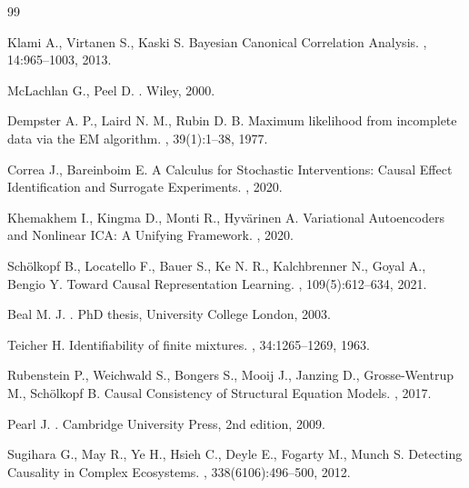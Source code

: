 \documentclass[a4paper,14pt]{article}
\theoremstyle{plain} %
\theoremstyle{definition} %
\theoremstyle{remark} %
\begin{document}
\begin{thebibliography}{99}

Klami A., Virtanen S., Kaski S.
\newblock Bayesian Canonical Correlation Analysis.
, 14:965--1003, 2013.

McLachlan G., Peel D.
.
\newblock Wiley, 2000.

Dempster A. P., Laird N. M., Rubin D. B.
\newblock Maximum likelihood from incomplete data via the EM algorithm.
, 39(1):1--38, 1977.

Correa J., Bareinboim E.
\newblock A Calculus for Stochastic Interventions: Causal Effect Identification and Surrogate Experiments.
, 2020.

Khemakhem I., Kingma D., Monti R., Hyvärinen A.
\newblock Variational Autoencoders and Nonlinear ICA: A Unifying Framework.
, 2020.

Schölkopf B., Locatello F., Bauer S., Ke N. R., Kalchbrenner N., Goyal A., Bengio Y.
\newblock Toward Causal Representation Learning.
, 109(5):612--634, 2021.

Beal M. J.
.
\newblock PhD thesis, University College London, 2003.

Teicher H.
\newblock Identifiability of finite mixtures.
, 34:1265--1269, 1963.

Rubenstein P., Weichwald S., Bongers S., Mooij J., Janzing D., Grosse-Wentrup M., Schölkopf B.
\newblock Causal Consistency of Structural Equation Models.
, 2017.

Pearl J.
.
\newblock Cambridge University Press, 2nd edition, 2009.

Sugihara G., May R., Ye H., Hsieh C., Deyle E., Fogarty M., Munch S.
\newblock Detecting Causality in Complex Ecosystems.
, 338(6106):496--500, 2012.

\end{thebibliography}
\end{document}
